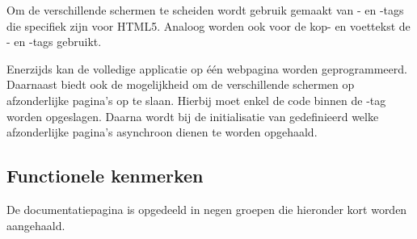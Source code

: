 Om de verschillende schermen te scheiden wordt gebruik gemaakt van - en -tags die specifiek zijn voor HTML5.
Analoog worden ook voor de kop- en voettekst de - en -tags gebruikt.

Enerzijds kan de volledige applicatie op één webpagina worden geprogrammeerd.
Daarnaast biedt \lungo{} ook de mogelijkheid om de verschillende schermen op afzonderlijke pagina's op te slaan.
Hierbij moet enkel de code binnen de -tag worden opgeslagen.
Daarna wordt bij de initialisatie van \lungo{} gedefinieerd welke afzonderlijke pagina's asynchroon dienen te worden opgehaald.

\subsection{Functionele kenmerken}
De documentatiepagina is opgedeeld in negen groepen die hieronder kort worden aangehaald.

